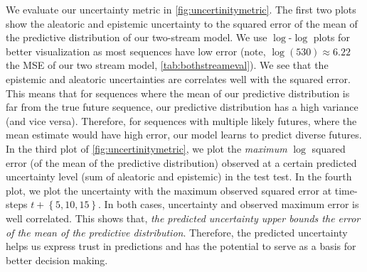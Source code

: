  We evaluate our uncertainty metric in \autoref{fig:uncertinitymetric}. The first two plots show the aleatoric and epistemic uncertainty to the squared error of the mean of the predictive distribution of our two-stream model. We use $\log$-$\log$ plots for better visualization as most sequences have low error (note, $\log(530) \approx 6.22$ the MSE of our two stream model, \autoref{tab:bothstreameval}). We see that the epistemic and aleatoric uncertainties are correlates well with the squared error. This means that for sequences where the mean of our predictive distribution is far from the true future sequence, our predictive distribution has a high variance (and vice versa). Therefore, for sequences with multiple likely futures, where the mean estimate would have high error, our model learns to predict diverse futures. In the third plot of \autoref{fig:uncertinitymetric}, we plot the \emph{maximum} $\log$ squared error (of the mean of the predictive distribution) observed at a certain predicted uncertainty level (sum of aleatoric and epistemic) in the test test. In the fourth plot, we plot the uncertainty with the maximum observed squared error at time-steps $t + \left\{5,10,15\right\}$. In both cases, uncertainty and observed maximum error is well correlated. This shows that, \emph{the predicted uncertainty upper bounds the error of the mean of the predictive distribution}. Therefore, the predicted uncertainty helps us express trust in predictions and has the potential to serve as a basis for better decision making. 
